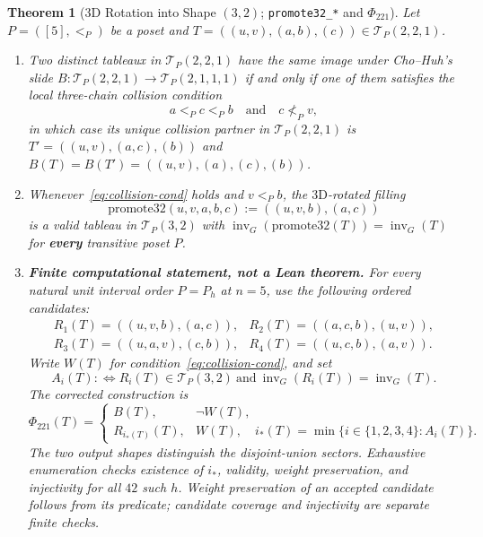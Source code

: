 \documentclass[11pt]{article}
\newtheorem{theorem}{Theorem}[section]
\theoremstyle{definition}
\newcommand{\invG}{\operatorname{inv}_G}
\newcommand{\TP}{\mathcal{T}_P}
\begin{document}
\begin{theorem}[3D Rotation into Shape $(3,2)$; \texttt{promote32\_*} and $\Phi_{221}$]
\label{thm:promote32}
Let $P = ([5], <_P)$ be a poset and $T = ((u, v), (a, b), (c)) \in \TP(2, 2, 1)$.
\begin{enumerate}
  \item Two distinct tableaux in $\TP(2,2,1)$ have the same image under Cho--Huh's slide $B : \TP(2,2,1) \to \TP(2,1,1,1)$ if and only if one of them satisfies the local three-chain collision condition
  \begin{equation}\label{eq:collision-cond}
    a <_P c <_P b \quad\text{and}\quad c \not<_P v,
  \end{equation}
  in which case its unique collision partner in $\TP(2,2,1)$ is $T' = ((u, v), (a, c), (b))$ and $B(T) = B(T') = ((u, v), (a), (c), (b))$.
  \item Whenever~\eqref{eq:collision-cond} holds and $v <_P b$, the $3\mathrm{D}$-rotated filling
  \[
    \mathrm{promote32}(u, v, a, b, c) := ((u, v, b), (a, c))
  \]
  is a valid tableau in $\TP(3,2)$ with $\invG(\mathrm{promote32}(T)) = \invG(T)$ for \textbf{every} transitive poset $P$.
  \item \textbf{Finite computational statement, not a Lean theorem.} For every natural unit interval order $P=P_h$ at $n=5$, use the following ordered candidates:
  \[
  \begin{array}{ll}
  R_1(T)=((u,v,b),(a,c)),& R_2(T)=((a,c,b),(u,v)),\\
  R_3(T)=((u,a,v),(c,b)),& R_4(T)=((u,c,b),(a,v)).
  \end{array}
  \]
  Write $W(T)$ for condition~\eqref{eq:collision-cond}, and set
  \[
  A_i(T):\Longleftrightarrow R_i(T)\in\TP(3,2)
       \ \text{and}\ \invG(R_i(T))=\invG(T).
  \]
  The corrected construction is
  \begin{equation}\label{eq:phi221}
  \Phi_{221}(T)=\begin{cases}
    B(T),&\neg W(T),\\
    R_{i_*(T)}(T),&W(T),\quad i_*(T)=\min\{i\in\{1,2,3,4\}:A_i(T)\}.
  \end{cases}
  \end{equation}
  The two output shapes distinguish the disjoint-union sectors. Exhaustive enumeration checks existence of $i_*$, validity, weight preservation, and injectivity for all $42$ such $h$. Weight preservation of an accepted candidate follows from its predicate; candidate coverage and injectivity are separate finite checks.
\end{enumerate}
\end{theorem}
\end{document}
